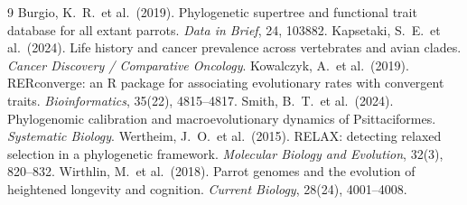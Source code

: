 \documentclass[10pt,a4paper,twocolumn]{article}
\begin{document}
\begin{thebibliography}{9}
\footnotesize
{} Burgio, K.\ R.\ et al.\ (2019). Phylogenetic supertree and functional trait database for all extant parrots. \textit{Data in Brief}, 24, 103882.
 Kapsetaki, S.\ E.\ et al.\ (2024). Life history and cancer prevalence across vertebrates and avian clades. \textit{Cancer Discovery / Comparative Oncology}.
 Kowalczyk, A.\ et al.\ (2019). RERconverge: an R package for associating evolutionary rates with convergent traits. \textit{Bioinformatics}, 35(22), 4815--4817.
 Smith, B.\ T.\ et al.\ (2024). Phylogenomic calibration and macroevolutionary dynamics of Psittaciformes. \textit{Systematic Biology}.
 Wertheim, J.\ O.\ et al.\ (2015). RELAX: detecting relaxed selection in a phylogenetic framework. \textit{Molecular Biology and Evolution}, 32(3), 820--832.
 Wirthlin, M.\ et al.\ (2018). Parrot genomes and the evolution of heightened longevity and cognition. \textit{Current Biology}, 28(24), 4001--4008.
\end{thebibliography}
\end{document}
